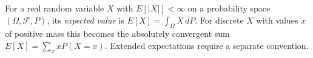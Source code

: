 
For a real random variable $X$ with $E[|X|]<\infty$ on a probability space $(\Omega,\mathcal F,P)$, its \emph{expected value} is $E[X]=\int_\Omega X\,dP$. For discrete $X$ with values $x$ of positive mass this becomes the absolutely convergent sum $E[X]=\sum_x xP(X=x)$. Extended expectations require a separate convention.
